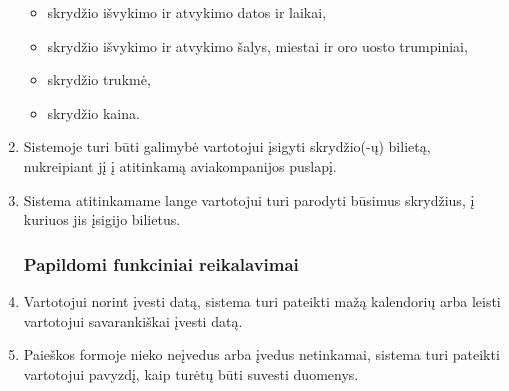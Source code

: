 \documentclass{VUMIFPSkursinis}
\begin{document}
\begin{enumerate}[label=\textbf{FR\arabic*}.]
                    	\begin{itemize}
                    		\item skrydžio išvykimo ir atvykimo datos ir laikai,
                    		\item skrydžio išvykimo ir atvykimo šalys, miestai ir oro uosto trumpiniai,
							\item skrydžio trukmė,
							\item skrydžio kaina.
                    	\end{itemize}
                    	\item Sistemoje turi būti galimybė vartotojui įsigyti skrydžio(-ų) bilietą, nukreipiant jį į atitinkamą aviakompanijos puslapį.
                    	\item Sistema atitinkamame lange vartotojui turi parodyti būsimus skrydžius, į kuriuos jis įsigijo bilietus.
                	\subsubsection{Papildomi funkciniai reikalavimai}
                    	\item \label{datos_ivedimas} Vartotojui norint įvesti datą, sistema turi pateikti mažą kalendorių arba leisti vartotojui savarankiškai įvesti datą.
                    	\item Paieškos formoje nieko neįvedus arba įvedus netinkamai, sistema turi pateikti vartotojui pavyzdį, kaip turėtų būti suvesti duomenys.
                \end{enumerate}
\end{document}
